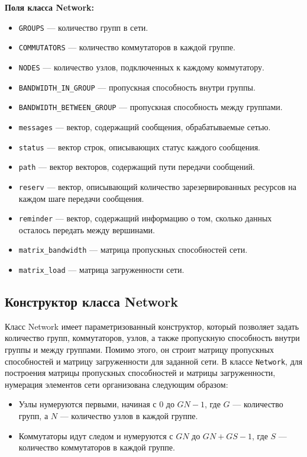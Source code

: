 \documentclass[11pt,a4paper,final]{article} %
\begin{document}
\textbf{Поля класса Network:}
\begin{itemize}
	\item \texttt{GROUPS} — количество групп в сети.
	\item \texttt{COMMUTATORS} — количество коммутаторов в каждой группе.
	\item \texttt{NODES} — количество узлов, подключенных к каждому коммутатору.
	\item \texttt{BANDWIDTH\_IN\_GROUP} — пропускная способность внутри группы.
	\item \texttt{BANDWIDTH\_BETWEEN\_GROUP} — пропускная способность между группами.
	\item \texttt{messages} — вектор, содержащий сообщения, обрабатываемые сетью.
	\item \texttt{status} — вектор строк, описывающих статус каждого сообщения.
	\item \texttt{path} — вектор векторов, содержащий пути передачи сообщений.
	\item \texttt{reserv} — вектор, описывающий количество зарезервированных ресурсов на каждом шаге передачи сообщения.
	\item \texttt{reminder} — вектор, содержащий информацию о том, сколько данных осталось передать между вершинами.
	\item \texttt{matrix\_bandwidth} — матрица пропускных способностей сети.
	\item \texttt{matrix\_load} — матрица загруженности сети.
\end{itemize}

\subsection{Конструктор класса Network}

Класс Network имеет параметризованный конструктор, который позволяет задать количество групп, коммутаторов, узлов, а также пропускную способность внутри группы и между группами. Помимо этого, он строит матрицу пропускных способностей и матрицу загруженности для заданной сети. В классе \texttt{Network}, для построения матрицы пропускных способностей и матрицы загруженности, нумерация элементов сети организована следующим образом:

\begin{itemize}
	\item Узлы нумеруются первыми, начиная с 0 до \( GN - 1 \), где \( G \) — количество групп, а \( N \) — количество узлов в каждой группе.
	\item Коммутаторы идут следом и нумеруются с \( GN \) до \( GN + GS - 1 \), где \( S \) — количество коммутаторов в каждой группе.
\end{itemize}
\end{document}
